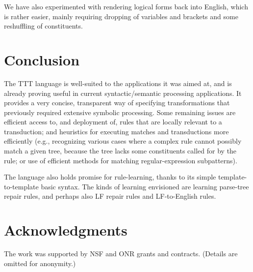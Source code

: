\documentclass[a4,11pt]{article}
\begin{document}
We have also experimented with rendering logical forms back into English, which is rather easier, mainly requiring dropping of variables and brackets and some reshuffling of constituents.

\section{Conclusion}
The TTT language is well-suited to the applications it was aimed at,
and is already proving useful in current syntactic/semantic
processing applications. It provides a very concise, transparent
way of specifying transformations that previously required
extensive symbolic processing. Some remaining issues are efficient access
to, and deployment of, rules that are locally relevant to a transduction; 
and heuristics for executing matches and transductions more efficiently (e.g.,
recognizing various cases where a complex rule cannot possibly match a
given tree, because the tree lacks some constituents called for by the
rule; or use of efficient methods for matching regular-expression subpatterns).

The language also holds promise for rule-learning, thanks to its simple 
template-to-template basic syntax. The kinds of learning envisioned
are learning parse-tree repair rules, and perhaps also LF repair
rules and LF-to-English rules.

\section*{Acknowledgments}
The work was supported by NSF and ONR grants and contracts. (Details are
omitted for anonymity.)
\end{document}
